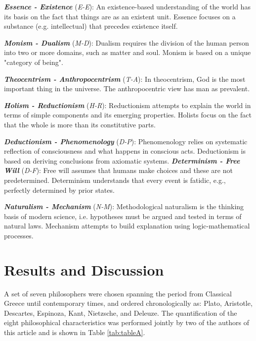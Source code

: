 \documentclass[%
 aip,
 jmp,%
 amsmath,amssymb,
 reprint,%
]{revtex4-1}
\begin{document}
{\bf \em{ Essence - Existence}} (\emph{E-E}): An existence-based
understanding of the world has its basis on the fact that things are
as an existent unit. Essence focuses on a substance
(e.g. intellectual) that precedes existence itself.

{\bf \em{ Monism - Dualism}} (\emph{M-D}): Dualism requires the
division of the human person into two or more domains, such as matter
and soul. Monism is based on a unique "category of being".

{\bf \em{ Theocentrism - Anthropocentrism}} (\emph{T-A}): In
theocentrism, God is the most important thing in the universe.  The
anthropocentric view has man as prevalent.

{\bf \em{ Holism - Reductionism}} (\emph{H-R}): Reductionism attempts
to explain the world in terms of simple components and its emerging
properties.  Holists focus on the fact that the whole is more than its
constitutive parts.

{\bf \em{ Deductionism - Phenomenology}} (\emph{D-P}): Phenomenology
relies on systematic reflection of consciousness and what happens in
conscious acts.  Deductionism is based on deriving conclusions from
axiomatic systems.  {\bf \em{ Determinism - Free Will}} (\emph{D-F}):
Free will assumes that humans make choices and these are not
predetermined.  Determinism understands that every event is fatidic,
e.g., perfectly determined by prior states.

{\bf \em{ Naturalism - Mechanism}} (\emph{N-M}): Methodological
naturalism is the thinking basis of modern science, i.e. hypotheses
must be argued and tested in terms of natural laws. Mechanism attempts
to build explanation using logic-mathematical processes.


\section{Results and Discussion}

A set of seven philosophers were chosen spanning the period from
Classical Greece until contemporary times, and ordered chronologically
as: Plato, Aristotle, Descartes, Espinoza, Kant, Nietzsche, and
Deleuze.  The quantification of the eight philosophical
characteristics was performed jointly by two of the authors of this
article and is shown in Table \ref{tab:tableA}.
\end{document}
